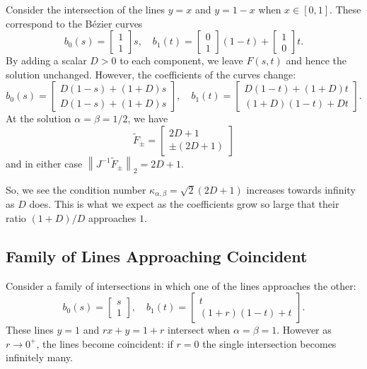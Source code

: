 \documentclass[3p, authoryear, square]{elsarticle}
\theoremstyle{definition}
\begin{document}
Consider the intersection of the lines \(y = x\) and \(y = 1 - x\) when
\(x \in \left[0, 1\right]\). These correspond to the B\'{e}zier curves
\begin{equation}
b_0(s) = \left[ \begin{array}{c} 1 \\ 1 \end{array}\right] s, \quad
b_1(t) = \left[ \begin{array}{c} 0 \\ 1 \end{array}\right] (1 - t) +
\left[ \begin{array}{c} 1 \\ 0 \end{array}\right] t.
\end{equation}
By adding a scalar \(D > 0\) to each component, we leave \(F(s, t)\) and hence
the solution unchanged. However, the coefficients of the curves change:
\begin{equation}
b_0(s) = \left[ \begin{array}{c} D(1 - s) + (1 + D)s \\ D(1 - s) + (1 + D)s
  \end{array}\right], \quad b_1(t) = \left[ \begin{array}{c}
  D(1 - t) + (1 + D)t \\ (1 + D)(1 - t) + Dt \end{array}\right].
\end{equation}
At the solution \(\alpha = \beta = 1/2\), we have
\begin{equation}
\widetilde{F}_{\pm} = \left[ \begin{array}{c} 2D + 1 \\ \pm(2D + 1)
  \end{array}\right]
\end{equation}
and in either case \(\left \lVert J^{-1} \widetilde{F}_{\pm} \right \rVert_2 =
2D + 1\).

So, we see the condition number \(\kappa_{\alpha, \beta} = \sqrt{2}(2D + 1)\)
increases towards infinity as \(D\) does. This is what we expect as the
coefficients grow so large that their ratio \((1 + D) / D\) approaches \(1\).

\subsection{Family of Lines Approaching Coincident}

Consider a family of intersections in which one of the lines approaches the
other:
\begin{equation}
b_0(s) = \left[ \begin{array}{c} s \\ 1 \end{array}\right], \quad
b_1(t) = \left[ \begin{array}{c} t \\ (1 + r)(1 - t) + t \end{array}\right].
\end{equation}
These lines \(y = 1\) and \(rx + y = 1 + r\) intersect when
\(\alpha = \beta = 1\). However as \(r \longrightarrow 0^+\), the lines
become coincident: if \(r = 0\) the single intersection becomes infinitely
many.
\end{document}
